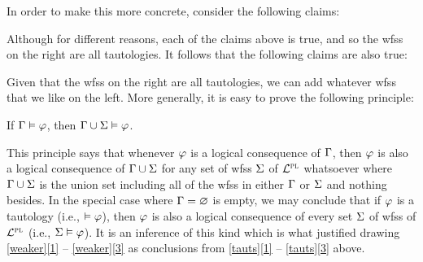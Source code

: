 
In order to make this more concrete, consider the following claims:

\begin{earg} \label{tauts}
\end{earg}

Although for different reasons, each of the claims above is true, and so the wfss on the right are all tautologies.
It follows that the following claims are also true:

\begin{earg} \label{weaker}
\end{earg}

Given that the wfss on the right are all tautologies, we can add whatever wfss that we like on the left.
More generally, it is easy to prove the following principle:

\begin{Lthm}[Weakening] \label{lemma:PL-weakening}
  If $\Gamma \vDash \varphi$, then $\Gamma \cup \Sigma \vDash \varphi$.
\end{Lthm}


This principle says that whenever $\varphi$ is a logical consequence of $\Gamma$, then $\varphi$ is also a logical consequence of $\Gamma \cup \Sigma$ for any set of wfss $\Sigma$ of $\mathcal{L}^{\textsc{pl}}$ whatsoever where $\Gamma \cup \Sigma$ is the union set including all of the wfss in either $\Gamma$ or $\Sigma$ and nothing besides. 
In the special case where $\Gamma = \varnothing$ is empty, we may conclude that if $\varphi$ is a tautology (i.e., $\vDash \varphi$), then $\varphi$ is also a logical consequence of every set $\Sigma$ of wfss of $\mathcal{L}^{\textsc{pl}}$ (i.e., $\Sigma \vDash \varphi$).
It is an inference of this kind which is what justified drawing \ref{weaker}\ref{1} -- \ref{weaker}\ref{3} as conclusions from \ref{tauts}\ref{1} -- \ref{tauts}\ref{3} above.

